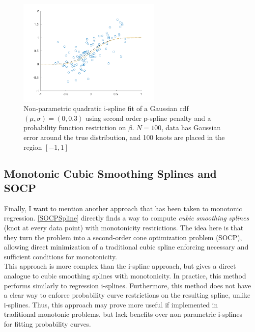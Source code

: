 \documentclass{article}
\begin{document}
	\begin{figure}[h]
		\centering
		\includegraphics[width=7cm]{normalcdfFit.pdf}
		\caption{Non-parametric quadratic i-spline fit of a Gaussian cdf $(\mu, \sigma) = (0, 0.3)$ using second order p-spline penalty and a probability function restriction on $\beta$. $N=100$, data has Gaussian error around the true distribution, and 100 knots are placed in the region $[-1,1]$}
	\end{figure}

	\subsection{Monotonic Cubic Smoothing Splines and SOCP}	
	
	Finally, I want to mention another approach that has been taken to monotonic regression. \ref{SOCPSpline} directly finds a way to compute \textit{cubic smoothing splines} (knot at every data point) with monotonicity restrictions. The idea here is that they turn the problem into a second-order cone optimization problem (SOCP), allowing direct minimization of a traditional cubic spline enforcing necessary and sufficient conditions for monotonicity. \\
	This approach is more complex than the i-spline approach, but gives a direct analogue to cubic smoothing splines with monotonicity. In practice, this method performs similarly to regression i-splines. Furthermore, this method does not have a clear way to enforce probability curve restrictions on the resulting spline, unlike i-splines. Thus, this approach may prove more useful if implemented in traditional monotonic problems, but lack benefits over non parametric i-splines for fitting probability curves.
	\newpage
	
\end{document}
